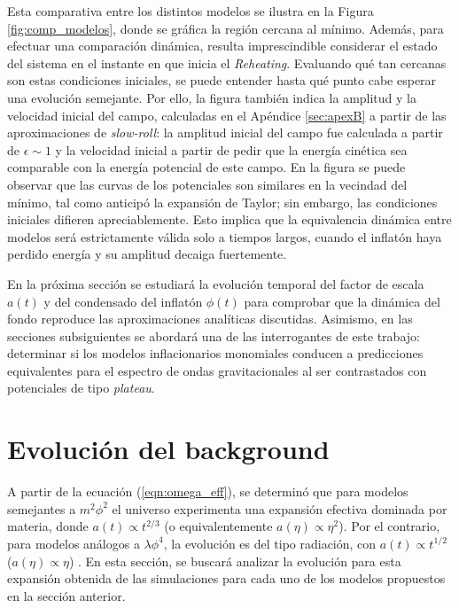Esta comparativa entre los distintos modelos se ilustra en la Figura \ref{fig:comp_modelos}, donde se gráfica la región cercana al mínimo. Además, para efectuar una comparación dinámica, resulta imprescindible considerar el estado del sistema en el instante en que inicia el \textit{Reheating}. Evaluando qué tan cercanas son estas condiciones iniciales, se puede entender hasta qué punto cabe esperar una evolución semejante. Por ello, la figura también indica la amplitud y la velocidad inicial del campo, calculadas en el Apéndice \ref{sec:apexB} a partir de las aproximaciones de \textit{slow-roll}: la amplitud inicial del campo fue calculada a partir de $\epsilon \sim 1$ y la velocidad inicial a partir de pedir que la energía cinética sea comparable con la energía potencial de este campo. En la figura se puede observar que las curvas de los potenciales son similares en la vecindad del mínimo, tal como anticipó la expansión de Taylor; sin embargo, las condiciones iniciales difieren apreciablemente. Esto implica que la equivalencia dinámica entre modelos será estrictamente válida solo a tiempos largos, cuando el inflatón haya perdido energía y su amplitud decaiga fuertemente.

En la próxima sección se estudiará la evolución temporal del factor de escala $a(t)$ y del condensado del inflatón $\phi(t)$ para comprobar que la dinámica del fondo reproduce las aproximaciones analíticas discutidas. Asimismo, en las secciones subsiguientes se abordará una de las interrogantes de este trabajo: determinar si los modelos inflacionarios monomiales conducen a predicciones equivalentes para el espectro de ondas gravitacionales al ser contrastados con potenciales de tipo \textit{plateau}.

\section{Evolución del background}

A partir de la ecuación (\ref{eqn:omega_eff}), se determinó que para modelos semejantes a $m^2 \phi^2$ el universo experimenta una expansión efectiva dominada por materia, donde $a(t) \propto t^{2/3}$ (o equivalentemente $a(\eta) \propto \eta^2$). Por el contrario, para modelos análogos a $\lambda \phi^4$, la evolución es del tipo radiación, con $a(t) \propto t^{1/2}$ ($a(\eta) \propto \eta$) \cite{Turner_1983}. En esta sección, se buscará analizar la evolución para esta expansión obtenida de las simulaciones para cada uno de los modelos propuestos en la sección anterior.

